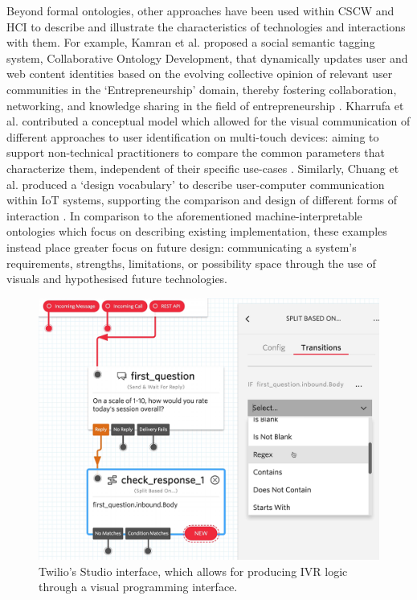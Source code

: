 Beyond formal ontologies, other approaches have been used within CSCW and HCI to describe and illustrate the characteristics of technologies and interactions with them. For example, Kamran et al. proposed a social semantic tagging system, Collaborative Ontology Development, that dynamically updates user and web content identities based on the evolving collective opinion of relevant user communities in the `Entrepreneurship' domain, thereby fostering collaboration, networking, and knowledge sharing in the field of entrepreneurship \cite{Kamran2016}. Kharrufa et al. contributed a conceptual model which allowed for the visual communication of different approaches to user identification on multi-touch devices: aiming to support non-technical practitioners to compare the common parameters that characterize them, independent of their specific use-cases \cite{Kharrufa2017}. Similarly, Chuang et al. produced a `design vocabulary' to describe user-computer communication within IoT systems, supporting the comparison and design of different forms of interaction \cite{Chuang2018}. In comparison to the aforementioned machine-interpretable ontologies which focus on describing existing implementation, these examples instead place greater focus on future design: communicating a system's requirements, strengths, limitations, or possibility space through the use of visuals and hypothesised future technologies. 

\begin{figure}[h]
  \centering
  \includegraphics[width=0.6\linewidth]{images/twilio.png}
  \caption{Twilio's Studio interface, which allows for producing IVR logic through a visual programming interface.}
  \label{fig:twilio}
\end{figure}

